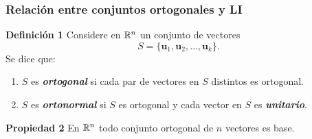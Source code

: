 \begin{frame}\frametitle{Relación entre conjuntos ortogonales y LI}
	
	\begin{defi}{\textbf{Definición 1}}\justifying
		Considere en $\mathbb{R}^n$ un conjunto de vectores
		\[
		S = \{ \mathbf{u}_1, \mathbf{u}_2, \hdots, \mathbf{u}_k\}.
		\]
		Se dice que:
		\begin{enumerate}
			\item[\labelname{$a$}] $S$ es  \textbf{\textit{ortogonal}} si cada par de vectores en $S$ distintos es ortogonal. %
			\item[\labelname{$b$}] $S$ es \textbf{\textit{ortonormal}} si $S$ es ortogonal y cada vector en $S$ es \textbf{\textit{unitario}}.
		\end{enumerate}
		
	\end{defi}	
	
	
	\begin{prop}{\textbf{Propiedad 2}}
		\justifying
		En $\mathbb{R}^n$ todo conjunto ortogonal de $n$ vectores es base.
	\end{prop}	
	
\end{frame}


\subsection{}

